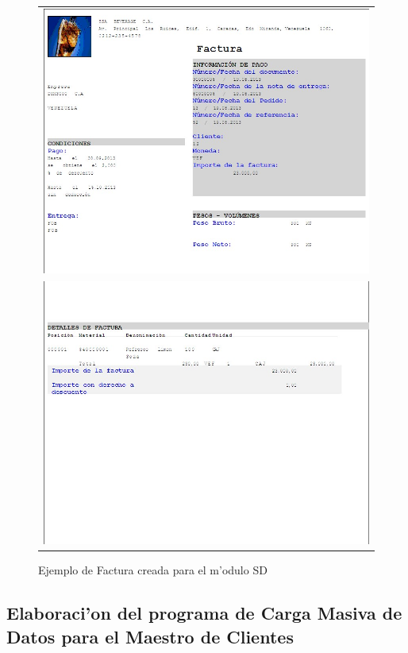 \begin{figure}[H]
\centering
\begin{tabular}{c}
\includegraphics[scale=0.65,type=jpg,ext=.jpg,read=.jpg]{figures/Factura1}\\
\includegraphics[scale=0.65,type=jpg,ext=.jpg,read=.jpg]{figures/Factura2}\\
\end{tabular}
\caption{Ejemplo de Factura creada para el m'odulo SD}
\label{fig:facturas}
\end{figure}

\subsection{Elaboraci'on del programa de Carga Masiva de Datos para el Maestro de Clientes}


